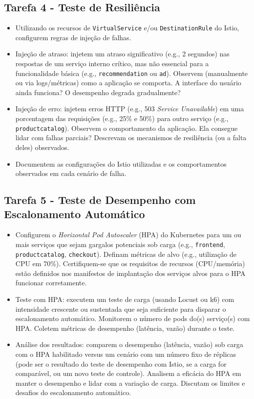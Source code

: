 \documentclass[12pt,a4paper]{report}
\begin{document}
\subsection{Tarefa 4 - Teste de Resiliência}
\begin{itemize}
    \item Utilizando os recursos de \texttt{VirtualService} e/ou \texttt{DestinationRule} do Istio, configurem regras de injeção de falhas.
    \item Injeção de atraso: injetem um atraso significativo (e.g., 2 segundos) nas respostas de um serviço interno crítico, mas não essencial para a funcionalidade básica (e.g., \texttt{recommendation} ou \texttt{ad}). Observem (manualmente ou via logs/métricas) como a aplicação se comporta. A interface do usuário ainda funciona? O desempenho degrada gradualmente?
    \item Injeção de erro: injetem erros HTTP (e.g., 503 \textit{Service Unavailable}) em uma porcentagem das requisições (e.g., 25\% e 50\%) para outro serviço (e.g., \texttt{productcatalog}). Observem o comportamento da aplicação. Ela consegue lidar com falhas parciais? Descrevam os mecanismos de resiliência (ou a falta deles) observados.
    \item Documentem as configurações do Istio utilizadas e os comportamentos observados em cada cenário de falha.
\end{itemize}

\subsection{Tarefa 5 - Teste de Desempenho com Escalonamento Automático}
\begin{itemize}
    \item Configurem o \textit{Horizontal Pod Autoscaler} (HPA) do Kubernetes para um ou mais serviços que sejam gargalos potenciais sob carga (e.g., \texttt{frontend}, \texttt{productcatalog}, \texttt{checkout}). Definam métricas de alvo (e.g., utilização de CPU em 70\%). Certifiquem-se que os requisitos de recursos (CPU/memória) estão definidos nos manifestos de implantação dos serviços alvos para o HPA funcionar corretamente.
    \item Teste com HPA: executem um teste de carga (usando Locust ou k6) com intensidade crescente ou sustentada que seja suficiente para disparar o escalonamento automático. Monitorem o número de pods do(s) serviço(s) com HPA. Coletem métricas de desempenho (latência, vazão) durante o teste.
    \item Análise dos resultados: comparem o desempenho (latência, vazão) sob carga com o HPA habilitado versus um cenário com um número fixo de réplicas (pode ser o resultado do teste de desempenho com Istio, se a carga for comparável, ou um novo teste de controle). Analisem a eficácia do HPA em manter o desempenho e lidar com a variação de carga. Discutam os limites e desafios do escalonamento automático.
\end{itemize}
\end{document}
